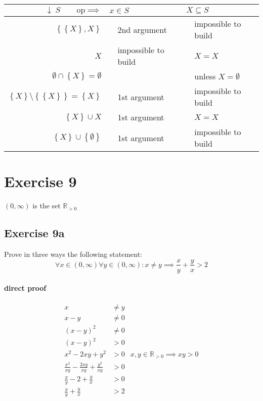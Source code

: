 \documentclass[a4paper]{article}
\theoremstyle{definition}
\newcommand\set[1]{\left\{#1\right\}}
\newcommand\yes{\checkmark}
\newcommand\no{\ding{55}}
\begin{document}
\begin{table}[!h]
 \begin{center}
  \begin{tabular}{rclcl}
   \hline\hline
    $\downarrow \ S \qquad \text{op} \implies$
        & \multicolumn{2}{l}{$x \in S$} & \multicolumn{2}{l}{$X \subseteq S$} \\
   \hline
    $\set{\set{X}, X}$
        & \yes & 2nd argument            & \no  & impossible to build \\
    $X$
        & \no  & impossible to build     & \yes & $X = X$ \\
    $\emptyset \cap \set{X} = \emptyset$
        & \no  &                         & \no  & unless $X = \emptyset$ \\
    $\set{X} \setminus \set{\set{X}} = \set{X}$
        & \yes & 1st argument            & \no  & impossible to build \\
    $\set{X} \cup X$
        & \yes & 1st argument            & \yes & $X = X$ \\
    $\set{X} \cup \set{\emptyset}$
        & \yes & 1st argument            & \no  & impossible to build \\
   \hline
  \end{tabular}
 \end{center}
\end{table}


\section{Exercise 9}

\centerline{ $(0, \infty)$ is the set $\mathbb{R}_{>0}$ }

\subsection{Exercise 9a}

Prove in three ways the following statement:
\[
    \forall x \in (0, \infty) \forall y \in (0, \infty):
    x \neq y \implies \frac xy + \frac yx > 2
\]

\paragraph{direct proof}
\begin{align*}
  x &\neq y \\
  x - y &\neq 0 \\
  (x - y)^2 &\neq 0 \\
  (x - y)^2 &> 0 \\
  x^2 - 2xy + y^2 &> 0    & x,y \in \mathbb{R}_{>0} \implies xy > 0 \\
  \frac{x^2}{xy} - \frac{2xy}{xy} + \frac{y^2}{xy} &> 0 \\
  \frac{x}{y} - 2 + \frac yx &> 0 \\
  \frac xy + \frac yx &> 2
\end{align*}
\end{document}
